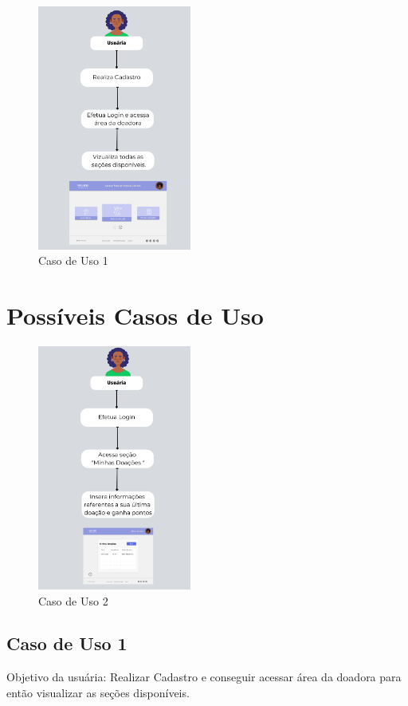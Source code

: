 \begin{figure}[h!]
    \centering
    \includegraphics[width=0.45\textwidth]{Figuras/cs1.pdf}
    \caption{Caso de Uso 1}
    \label{fig:cs1}
\end{figure} 

\section{Possíveis Casos de Uso}

\begin{figure}[h!]
    \centering
    \includegraphics[width=0.45\textwidth]{Figuras/cs2.pdf}
    \caption{Caso de Uso 2}
    \label{fig:cs2}
\end{figure}

\subsection{Caso de Uso 1}
Objetivo da usuária: Realizar Cadastro e conseguir acessar área da doadora para então visualizar as seções disponíveis.


